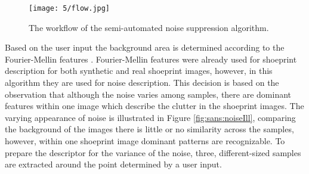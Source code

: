\documentclass[draft,final]{vutinfth} %
\begin{document}
\begin{figure}[h]
  \centering
  \texttt{[image: 5/flow.jpg]}
  \caption{The workflow of the semi-automated noise suppression algorithm.}
  \label{fig:sans:workflow} %
\end{figure}

\par
Based on the user input the background area is determined according to the Fourier-Mellin features \cite{sheng1986circular}.
Fourier-Mellin features were already used for shoeprint description for both synthetic \cite{gueham2008automatic} and real \cite{wu2019crime} shoeprint images, however, in this algorithm they are used for noise description.
This decision is based on the observation that although the noise varies among samples, there are dominant features within one image which describe the clutter in the shoeprint images.
The varying appearance of noise is illustrated in Figure \ref{fig:sans:noiseIll}, comparing the background of the images there is little or no similarity across the samples, however, within one shoeprint image dominant patterns are recognizable.
To prepare the descriptor for the variance of the noise, three, different-sized samples are extracted around the point determined by a user input.
\end{document}
